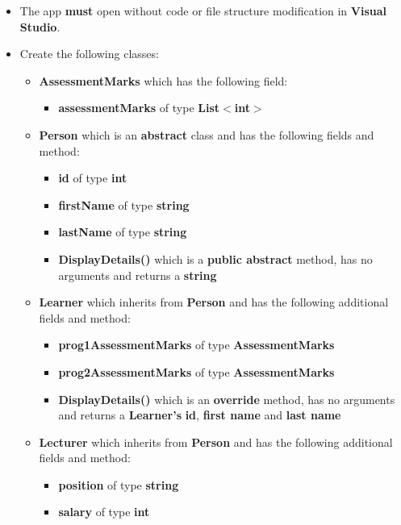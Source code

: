 \documentclass{article}
\begin{document}
\begin{itemize}
    \item The app \textbf{must} open without code or file structure modification in \textbf{Visual Studio}.
    \item Create the following classes:
    \begin{itemize}
        \item \textbf{AssessmentMarks} which has the following field:
        \begin{itemize}
            \item \textbf{assessmentMarks} of type \textbf{List$<$int$>$}
        \end{itemize}
        \item \textbf{Person} which is an \textbf{abstract} class and has the following fields and method:
        \begin{itemize}
            \item \textbf{id} of type \textbf{int}
            \item \textbf{firstName} of type \textbf{string}
            \item \textbf{lastName} of type \textbf{string}
            \item \textbf{DisplayDetails()} which is a \textbf{public abstract} method, has no arguments and returns a \textbf{string}
        \end{itemize}    
        \item \textbf{Learner} which inherits from \textbf{Person} and has the following additional fields and method:
        \begin{itemize}
            \item \textbf{prog1AssessmentMarks} of type \textbf{AssessmentMarks}
            \item \textbf{prog2AssessmentMarks} of type \textbf{AssessmentMarks}
            \item \textbf{DisplayDetails()} which is an \textbf{override} method, has no arguments and returns a \textbf{Learner's} \textbf{id}, \textbf{first name} and \textbf{last name}
        \end{itemize}
        \item \textbf{Lecturer} which inherits from \textbf{Person} and has the following additional fields and method:
        \begin{itemize}
            \item \textbf{position} of type \textbf{string}
            \item \textbf{salary} of type \textbf{int}

\end{itemize}
\end{itemize}
\end{itemize}
\end{document}
